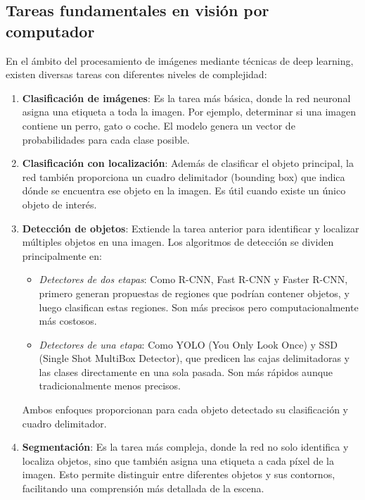 \documentclass[11pt,spanish,listoffigures,listoftables]{tfgetsinf}
\begin{document}
\subsection{Tareas fundamentales en visión por computador}
En el ámbito del procesamiento de imágenes mediante técnicas de deep learning, existen diversas tareas con diferentes niveles de complejidad:

\begin{enumerate}
    \item \textbf{Clasificación de imágenes}: Es la tarea más básica, donde la red neuronal asigna una etiqueta a toda la imagen. Por ejemplo, determinar si una imagen contiene un perro, gato o coche. El modelo genera un vector de probabilidades para cada clase posible.
    
    \item \textbf{Clasificación con localización}: Además de clasificar el objeto principal, la red también proporciona un cuadro delimitador (bounding box) que indica dónde se encuentra ese objeto en la imagen. Es útil cuando existe un único objeto de interés.
    
   \item \textbf{Detección de objetos}: Extiende la tarea anterior para identificar y localizar múltiples objetos en una imagen. Los algoritmos de detección se dividen principalmente en:
      \begin{itemize}
         \item \textit{Detectores de dos etapas}: Como R-CNN, Fast R-CNN y Faster R-CNN, primero generan propuestas de regiones que podrían contener objetos, y luego clasifican estas regiones. Son más precisos pero computacionalmente más costosos.
         \item \textit{Detectores de una etapa}: Como YOLO (You Only Look Once) y SSD (Single Shot MultiBox Detector), que predicen las cajas delimitadoras y las clases directamente en una sola pasada. Son más rápidos aunque tradicionalmente menos precisos.
      \end{itemize}
      Ambos enfoques proporcionan para cada objeto detectado su clasificación y cuadro delimitador.
    
    \item \textbf{Segmentación}: Es la tarea más compleja, donde la red no solo identifica y localiza objetos, sino que también asigna una etiqueta a cada píxel de la imagen. Esto permite distinguir entre diferentes objetos y sus contornos, facilitando una comprensión más detallada de la escena.
\end{enumerate}
\end{document}

